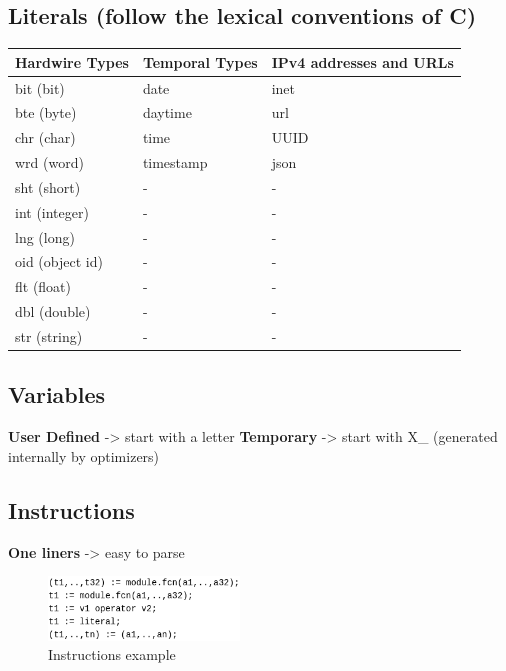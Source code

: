 \documentclass[11pt]{article}
\begin{document}
\subsection{Literals (follow the lexical conventions of C)}
\label{sec:org456cfcd}

\begin{center}
\begin{tabular}{lll}
\hline
\textbf{Hardwire Types} & \textbf{Temporal Types} & \textbf{IPv4 addresses and URLs}\\
\hline
bit (bit) & date & inet\\
\hline
bte (byte) & daytime & url\\
\hline
chr (char) & time & UUID\\
\hline
wrd (word) & timestamp & json\\
\hline
sht (short) & - & -\\
\hline
int (integer) & - & -\\
\hline
lng (long) & - & -\\
\hline
oid (object id) & - & -\\
\hline
flt (float) & - & -\\
\hline
dbl (double) & - & -\\
\hline
str (string) & - & -\\
\hline
\end{tabular}
\end{center}

\subsection{Variables}
\label{sec:org8adf0eb}

\textbf{User Defined} -> start with a letter
\textbf{Temporary}    -> start with X\_ (generated internally by optimizers)

\subsection{Instructions}
\label{sec:orgc2ffb0f}

\textbf{One liners}   -> easy to parse

\begin{figure}[htbp]
\centering
\includegraphics[width=2.0in]{./Pictures/instructions-ex.png}
\caption{\label{fig:orge799433}
Instructions example}
\end{figure}
\end{document}
